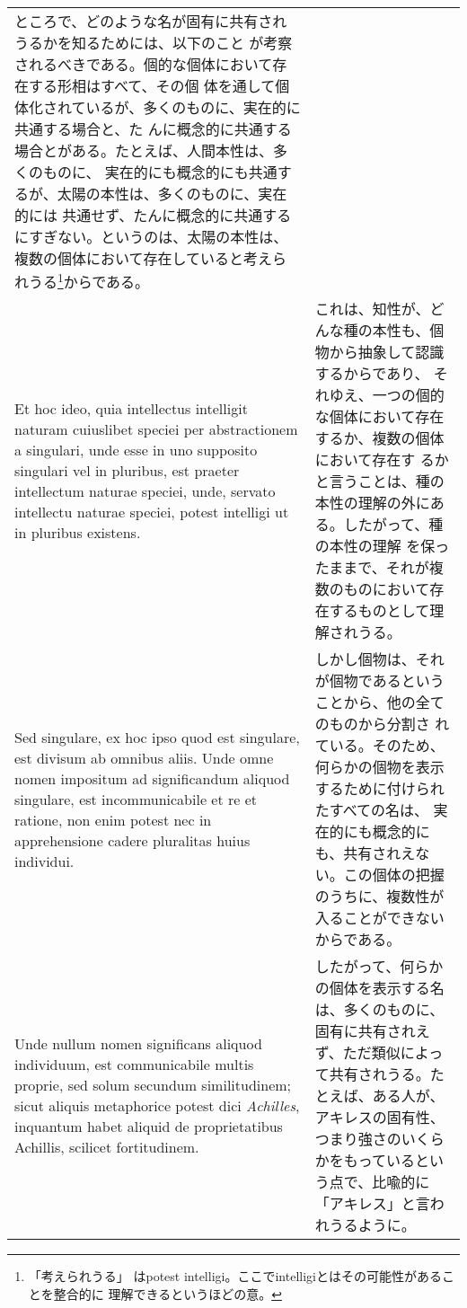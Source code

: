 \documentclass[10pt]{jsarticle}
\begin{document}
\begin{longtable}{p{21em}p{21em}}
ところで、どのような名が固有に共有されうるかを知るためには、以下のこと
が考察されるべきである。個的な個体において存在する形相はすべて、その個
体を通して個体化されているが、多くのものに、実在的に共通する場合と、た
んに概念的に共通する場合とがある。たとえば、人間本性は、多くのものに、
実在的にも概念的にも共通するが、太陽の本性は、多くのものに、実在的には
共通せず、たんに概念的に共通するにすぎない。というのは、太陽の本性は、
複数の個体において存在していると考えられうる\footnote{「考えられうる」
はpotest intelligi。ここでintelligiとはその可能性があることを整合的に
理解できるというほどの意。}からである。

\\

Et hoc ideo, quia intellectus intelligit naturam cuiuslibet speciei
per abstractionem a singulari, unde esse in uno supposito singulari
vel in pluribus, est praeter intellectum naturae speciei, unde,
servato intellectu naturae speciei, potest intelligi ut in pluribus
existens.

&

これは、知性が、どんな種の本性も、個物から抽象して認識するからであり、
それゆえ、一つの個的な個体において存在するか、複数の個体において存在す
るかと言うことは、種の本性の理解の外にある。したがって、種の本性の理解
を保ったままで、それが複数のものにおいて存在するものとして理解されうる。

\\

Sed singulare, ex hoc ipso quod est singulare, est divisum ab omnibus
aliis. Unde omne nomen impositum ad significandum aliquod singulare,
est incommunicabile et re et ratione, non enim potest nec in
apprehensione cadere pluralitas huius individui.

&

しかし個物は、それが個物であるということから、他の全てのものから分割さ
れている。そのため、何らかの個物を表示するために付けられたすべての名は、
実在的にも概念的にも、共有されえない。この個体の把握のうちに、複数性が
入ることができないからである。

\\

Unde nullum nomen significans aliquod individuum, est communicabile
multis proprie, sed solum secundum similitudinem; sicut aliquis
metaphorice potest dici {\itshape Achilles}, inquantum habet aliquid
de proprietatibus Achillis, scilicet fortitudinem.

&

したがって、何らかの個体を表示する名は、多くのものに、固有に共有されえ
ず、ただ類似によって共有されうる。たとえば、ある人が、アキレスの固有性、
つまり強さのいくらかをもっているという点で、比喩的に「アキレス」と言わ
れうるように。


\end{longtable}
\end{document}
